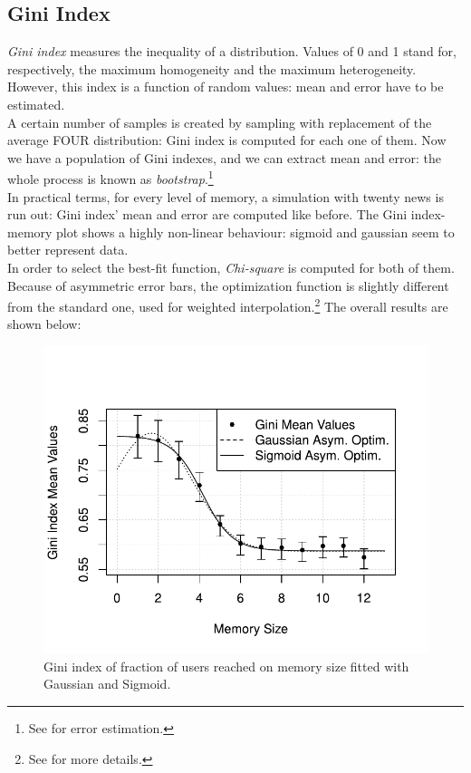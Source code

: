 \subsection{Gini Index}
\textit{Gini index}\cite{ginindex} measures the inequality of a
distribution. Values of 0 and 1 stand for, respectively, the
maximum homogeneity and the maximum heterogeneity.
However, this index is a function of random values: mean and
error have to be estimated.\\
A certain number of samples is created by sampling with replacement
of the average FOUR distribution: Gini index is computed for each
one of them.
Now we have a population of Gini indexes, and we can extract
mean and error: the whole process is known as
\textit{bootstrap}.\footnote{See  for error estimation.}\cite{bootstrap}\\
In practical terms, for every level of  memory, a simulation with
twenty news is run out: Gini index' mean and error are computed
like before.
The Gini index-memory plot shows a highly non-linear behaviour:
sigmoid and gaussian seem to better represent data.\\
In order to select the best-fit function, \textit{Chi-square} is
computed for both of them. \\
Because of asymmetric error bars, the optimization function is
slightly different from the standard one, used for weighted
interpolation.\footnote{See  for more details.}
The overall results are shown below:
%
%
\begin{figure}[h]
  \centering
  \includegraphics[trim={0cm 0cm 0cm 1cm},clip,width=.8\columnwidth]{img/gini.pdf}
  \caption[Gini index on memory size]
  {Gini index of fraction of users reached on memory size
    fitted with Gaussian and Sigmoid.
  }
  \label{fig:gini}
\end{figure}
